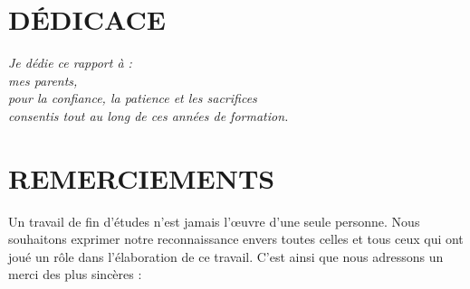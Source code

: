 
\chapter*{DÉDICACE}

\vspace{2cm}
\begin{flushright}
\begin{minipage}{0.62\textwidth}
\begin{flushright}
{\large\itshape Je dédie ce rapport à :}\\[1.4cm]
{\Large\itshape\color{keyceblue} mes parents,}\\[0.5cm]
{\large\itshape pour la confiance, la patience et les sacrifices\\
consentis tout au long de ces années de formation.}
\end{flushright}
\end{minipage}
\end{flushright}
\vspace*{\fill}

\cleardoublepage
{}
\chapter*{REMERCIEMENTS}

Un travail de fin d'études n'est jamais l'œuvre d'une seule personne. Nous
souhaitons exprimer notre reconnaissance envers toutes celles et tous ceux qui
ont joué un rôle dans l'élaboration de ce travail. C'est ainsi que nous
adressons un merci des plus sincères :

